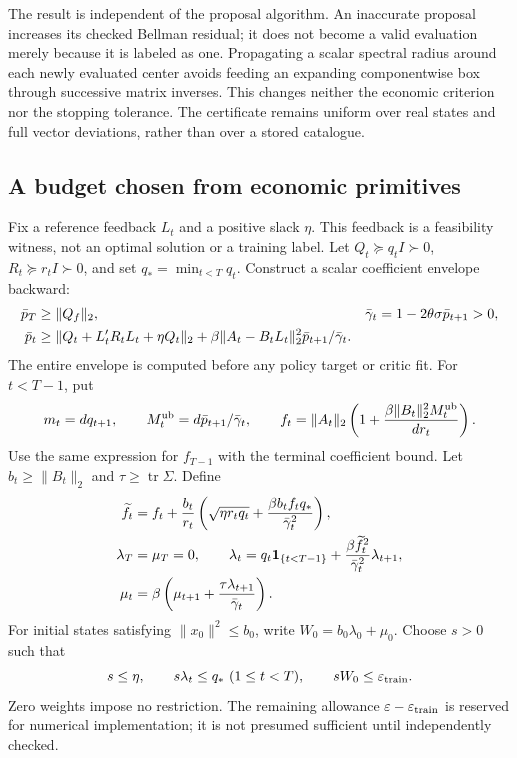 The result is independent of the proposal algorithm. An inaccurate proposal
increases its checked Bellman residual; it does not become a valid evaluation
merely because it is labeled as one. Propagating a scalar spectral radius
around each newly evaluated center avoids feeding an expanding componentwise
box through successive matrix inverses. This changes neither the economic
criterion nor the stopping tolerance. The certificate remains uniform over
real states and full vector deviations, rather than over a stored catalogue.

\subsection{A budget chosen from economic primitives}
Fix a reference feedback $L_t$ and a positive slack $\eta$. This feedback is a
feasibility witness, not an optimal solution or a training label. Let
$Q_t\succeq q_tI\succ0$, $R_t\succeq r_tI\succ0$, and set
$q_* =\min_{t<T}q_t$. Construct a scalar coefficient envelope backward:
\begin{align}
 \bar p_T&\geq\|Q_f\|_2,&
 \bar\gamma_t&=1-2\theta\sigma\bar p_{t+1}>0,\notag\\
 \bar p_t&\geq\|Q_t+L_t'R_tL_t+\eta Q_t\|_2
 +\beta\|A_t-B_tL_t\|_2^2\bar p_{t+1}/\bar\gamma_t.
 \label{eq:r31primitive}
\end{align}
The entire envelope is computed before any policy target or critic fit.
For $t<T-1$, put
\[
 m_t=dq_{t+1},\qquad M_t^{\rm ub}=d\bar p_{t+1}/\bar\gamma_t,
 \qquad
 f_t=\|A_t\|_2\left(1+
        \frac{\beta\|B_t\|_2^2M_t^{\rm ub}}{dr_t}\right).
\]
Use the same expression for $f_{T-1}$ with the terminal coefficient bound.
Let $b_t\geq\|B_t\|_2$ and $\tau\geq\operatorname{tr}\Sigma$. Define
\begin{align}
 \widetilde f_t&=f_t+\frac{b_t}{r_t}
       \left(\sqrt{\eta r_tq_t}
                +\frac{\beta b_tf_tq_*}{\bar\gamma_t^2}\right),\notag\\
 \lambda_T&=\mu_T=0,\qquad
 \lambda_t=q_t\mathbf1_{\{t<T-1\}}
           +\frac{\beta\widetilde f_t^2}{\bar\gamma_t^2}\lambda_{t+1},
 \notag\\
 \mu_t&=\beta\left(\mu_{t+1}
                +\frac{\tau\lambda_{t+1}}{\bar\gamma_t}\right).
 \label{eq:r31weights}
\end{align}
For initial states satisfying $\|x_0\|^2\leq b_0$, write
$W_0=b_0\lambda_0+\mu_0$. Choose $s>0$ such that
\begin{equation}
 s\leq\eta,\qquad s\lambda_t\leq q_*\ (1\leq t<T),\qquad
 sW_0\leq\varepsilon_{\rm train}.
 \label{eq:r31allocate}
\end{equation}
Zero weights impose no restriction. The remaining allowance
$\varepsilon-\varepsilon_{\rm train}$ is reserved for numerical implementation;
it is not presumed sufficient until independently checked.

